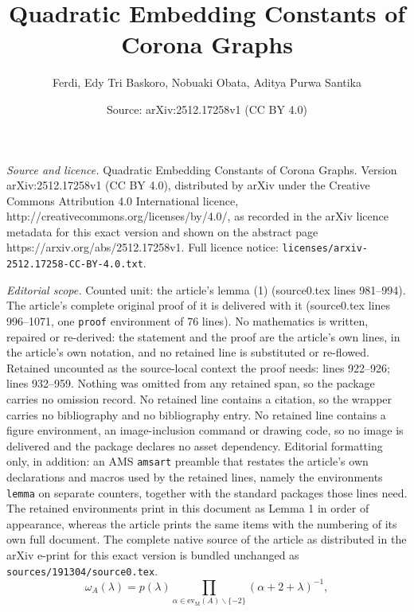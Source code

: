 \documentclass[10pt,a4paper]{amsart}
\title{Quadratic Embedding Constants of Corona Graphs}
\author{Ferdi, Edy Tri Baskoro, Nobuaki Obata, Aditya Purwa Santika}
\date{Source: arXiv:2512.17258v1 (CC BY 4.0)}
\begin{document}
\maketitle

\noindent\emph{Source and licence.} Quadratic Embedding Constants of Corona Graphs. Version arXiv:2512.17258v1 (CC BY 4.0), distributed by arXiv under the Creative Commons Attribution 4.0 International licence, http://creativecommons.org/licenses/by/4.0/, as recorded in the arXiv licence metadata for this exact version and shown on the abstract page https://arxiv.org/abs/2512.17258v1. Full licence notice: \texttt{licenses/arxiv-2512.17258-CC-BY-4.0.txt}.\par\smallskip

\noindent\textit{Editorial scope.} Counted unit: the article's lemma (1) (source0.tex lines 981--994). The article's complete original proof of it is delivered with it (source0.tex lines 996--1071, one \texttt{proof} environment of 76 lines). No mathematics is written, repaired or re-derived: the statement and the proof are the article's own lines, in the article's own notation, and no retained line is substituted or re-flowed.  Retained uncounted as the source-local context the proof needs: lines 922--926; lines 932--959.  Nothing was omitted from any retained span, so the package carries no omission record.  No retained line contains a citation, so the wrapper carries no bibliography and no bibliography entry.  No retained line contains a figure environment, an image-inclusion command or drawing code, so no image is delivered and the package declares no asset dependency.  Editorial formatting only, in addition: an AMS \texttt{amsart} preamble that restates the article's own declarations and macros used by the retained lines, namely the environments \texttt{lemma} on separate counters, together with the standard packages those lines need.  The retained environments print in this document as Lemma 1 in order of appearance, whereas the article prints the same items with the numbering of its own full document.  The complete native source of the article as distributed in the arXiv e-print for this exact version is bundled unchanged as \texttt{sources/191304/source0.tex}.
\begin{equation}\label{03eqn:omega(lambda) as rational function}
\omega_A(\lambda)
=p(\lambda)\prod_{\alpha\in\mathrm{ev}_{\mathrm{M}}(A)\backslash\{-2\}}
 (\alpha+2+\lambda)^{-1},
\end{equation}
\end{document}
